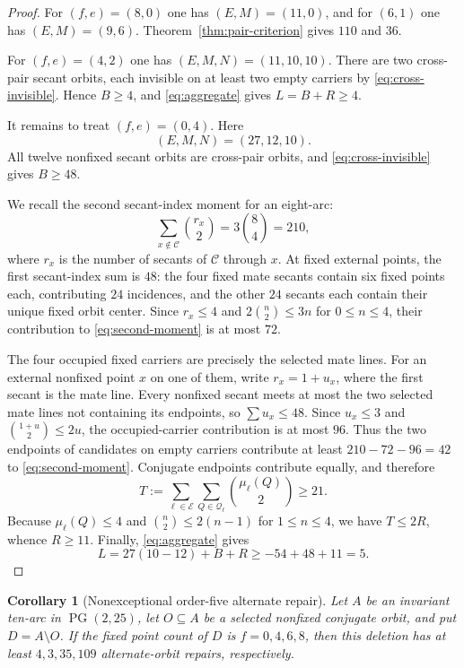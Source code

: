 \documentclass[11pt]{article}
\newtheorem{corollary}[theorem]{Corollary}
\theoremstyle{definition}
\theoremstyle{remark}
\newcommand{\PG}{\operatorname{PG}}
\newcommand{\cC}{\mathcal{C}}
\newcommand{\cE}{\mathcal{E}}
\newcommand{\cQ}{\mathcal{Q}}
\begin{document}
\begin{proof}
For $(f,e)=(8,0)$ one has $(E,M)=(11,0)$, and for $(6,1)$ one has
$(E,M)=(9,6)$.  Theorem~\ref{thm:pair-criterion} gives $110$ and $36$.

For $(f,e)=(4,2)$ one has $(E,M,N)=(11,10,10)$.  There are two cross-pair
secant orbits, each invisible on at least two empty carriers by
\eqref{eq:cross-invisible}.  Hence $B\ge4$, and
\eqref{eq:aggregate} gives $L=B+R\ge4$.

It remains to treat $(f,e)=(0,4)$.  Here
\[
  (E,M,N)=(27,12,10).
\]
All twelve nonfixed secant orbits are cross-pair orbits, and
\eqref{eq:cross-invisible} gives $B\ge48$.

We recall the second secant-index moment for an eight-arc:
\begin{equation}\label{eq:second-moment}
  \sum_{x\notin\cC}\binom{r_x}{2}=3\binom84=210,
\end{equation}
where $r_x$ is the number of secants of $\cC$ through $x$.  At fixed
external points, the first secant-index sum is $48$: the four fixed mate
secants contain six fixed points each, contributing $24$ incidences, and
the other $24$ secants each contain their unique fixed orbit center.  Since $r_x\le4$ and
$2\binom n2\le3n$ for $0\le n\le4$, their contribution to
\eqref{eq:second-moment} is at most $72$.

The four occupied fixed carriers are precisely the selected mate lines.
For an external nonfixed point $x$ on one of them, write $r_x=1+u_x$, where
the first secant is the mate line.  Every nonfixed secant meets at most the
two selected mate lines not containing its endpoints, so
$\sum u_x\le48$.  Since $u_x\le3$ and
$\binom{1+u}{2}\le2u$, the occupied-carrier contribution is at most $96$.
Thus the two endpoints of candidates on empty carriers contribute at least
$210-72-96=42$ to \eqref{eq:second-moment}.  Conjugate endpoints contribute
equally, and therefore
\[
  T:=\sum_{\ell\in\cE}\sum_{Q\in\cQ_\ell}
       \binom{\mu_\ell(Q)}2\ge21.
\]
Because $\mu_\ell(Q)\le4$ and
$\binom n2\le2(n-1)$ for $1\le n\le4$, we have $T\le2R$, whence $R\ge11$.
Finally, \eqref{eq:aggregate} gives
\[
  L=27(10-12)+B+R\ge-54+48+11=5.
\]
\end{proof}

\begin{corollary}[Nonexceptional order-five alternate repair]
\label{cor:q25-nonexceptional-repair}
Let $A$ be an invariant ten-arc in $\PG(2,25)$, let $O\subseteq A$ be a
selected nonfixed conjugate orbit, and put $D=A\setminus O$.  If the fixed
point count of $D$ is $f=0,4,6,8$, then this deletion has at least
$4,3,35,109$ alternate-orbit repairs, respectively.
\end{corollary}
\end{document}
